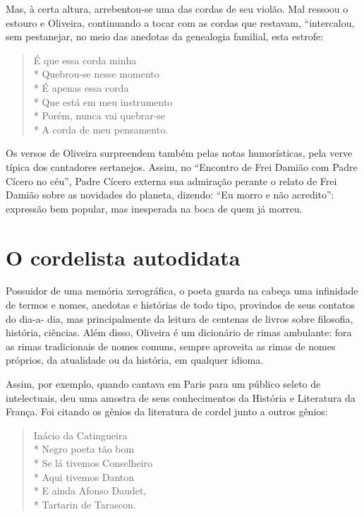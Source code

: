 Mas, à certa altura, arrebentou-se uma das cordas de
seu violão. Mal ressoou o estouro e Oliveira, continuando
a tocar com as cordas que restavam, ``intercalou, sem
pestanejar, no meio das anedotas da genealogia familial,
esta estrofe:

\begin{verse}

É que essa corda minha\\*
Quebrou-se nesse momento\\*
É apenas essa corda\\*
Que está em meu instrumento\\*
Porém, nunca vai quebrar-se\\*
A corda de meu pensamento.

\end{verse}

Os versos de Oliveira surpreendem também pelas notas
humorísticas, pela verve típica dos cantadores sertanejos.
Assim, no ``Encontro de Frei Damião com Padre Cícero
no céu'', Padre Cícero externa sua admiração perante o
relato de Frei Damião sobre as novidades do planeta,
dizendo: ``Eu morro e não acredito'':
expressão bem
popular, mas inesperada na boca de quem já morreu.

\section{O cordelista autodidata}

Possuidor de uma memória xerográfica, o poeta guarda
na cabeça uma infinidade de termos e nomes, anedotas e
histórias de todo tipo, provindos de seus contatos do dia-a-
dia, mas principalmente da leitura de centenas de livros
sobre filosofia, história, ciências. Além disso, Oliveira é um
dicionário de rimas ambulante: fora as rimas tradicionais
de nomes comuns, sempre aproveita as rimas de nomes
próprios, da atualidade ou da história, em qualquer idioma.

Assim, por exemplo, quando cantava em Paris para um
público seleto de intelectuais, deu uma amostra de seus
conhecimentos da História e Literatura da França. Foi
citando os gênios da literatura de cordel junto a outros
gênios:

\begin{verse}

Inácio da Catingueira\\*
Negro poeta tão bom\\*
Se lá tivemos Conselheiro\\*
Aqui tivemos Danton\\*
E ainda Afonso Daudet,\\*
Tartarin de Tarascon.

\end{verse}

